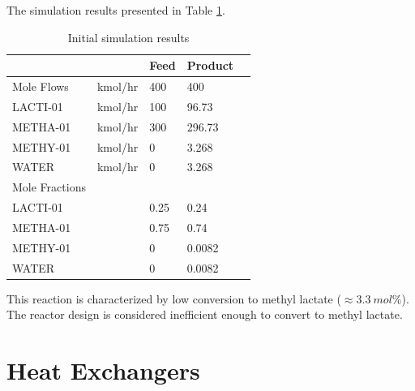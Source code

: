 The simulation results presented in Table \ref{tab:Ester_Initial}.

\begin{table}[h!]
	\centering
	\begin{tabular}{ll|lll}
		&         	   & Feed 	 & Product 	&  \\ \hline
		Mole Flows     & kmol/hr & 400  	& 400     &  \\
		LACTI-01       & kmol/hr & 100  	& 96.73   &  \\
		METHA-01       & kmol/hr & 300  	& 296.73  &  \\
		METHY-01       & kmol/hr & 0    	& 3.268   &  \\
		WATER          & kmol/hr & 0    	& 3.268   &  \\ \hline
		Mole Fractions &         &      	&         &  \\
		LACTI-01       &         & 0.25 	& 0.24    &  \\
		METHA-01       &         & 0.75 	& 0.74    &  \\
		METHY-01       &         & 0    	& 0.0082  &  \\
		WATER          &         & 0    	& 0.0082  & 
	\end{tabular}
	\caption{Initial simulation results}
	\label{tab:Ester_Initial}
\end{table}

This reaction is characterized by low conversion to methyl lactate ($\approx 3.3~mol\%$). The reactor design is considered inefficient enough to convert to methyl lactate.

\section{Heat Exchangers}

